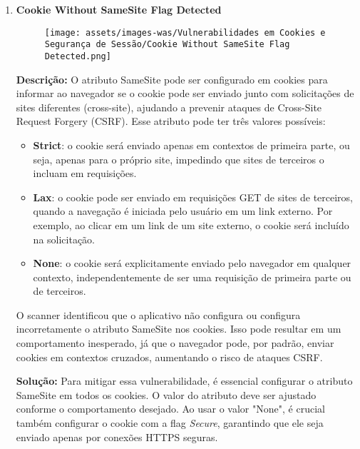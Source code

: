 \documentclass[a4paper,12pt]{article}
\begin{document}
\begin{enumerate}
\item \textbf{Cookie Without SameSite Flag Detected}

                        \begin{figure}[h!]
                        \centering
                        \texttt{[image: assets/images-was/Vulnerabilidades em Cookies e Segurança de Sessão/Cookie Without SameSite Flag Detected.png]}
                        \end{figure}
                        \FloatBarrier
                        \textbf{Descrição:} O atributo SameSite pode ser configurado em cookies para informar ao navegador se o cookie pode ser enviado junto com solicitações de sites diferentes (cross-site), ajudando a prevenir ataques de Cross-Site Request Forgery (CSRF). Esse atributo pode ter três valores possíveis:

    \begin{itemize}
    \item \textbf{Strict}: o cookie será enviado apenas em contextos de primeira parte, ou seja, apenas para o próprio site, impedindo que sites de terceiros o incluam em requisições.
    \item \textbf{Lax}: o cookie pode ser enviado em requisições GET de sites de terceiros, quando a navegação é iniciada pelo usuário em um link externo. Por exemplo, ao clicar em um link de um site externo, o cookie será incluído na solicitação.
    \item \textbf{None}: o cookie será explicitamente enviado pelo navegador em qualquer contexto, independentemente de ser uma requisição de primeira parte ou de terceiros.
    \end{itemize}

O scanner identificou que o aplicativo não configura ou configura incorretamente o atributo SameSite nos cookies. Isso pode resultar em um comportamento inesperado, já que o navegador pode, por padrão, enviar cookies em contextos cruzados, aumentando o risco de ataques CSRF.

\textbf{Solução:} Para mitigar essa vulnerabilidade, é essencial configurar o atributo SameSite em todos os cookies. O valor do atributo deve ser ajustado conforme o comportamento desejado. Ao usar o valor "None", é crucial também configurar o cookie com a flag \textit{Secure}, garantindo que ele seja enviado apenas por conexões HTTPS seguras.


\end{enumerate}
\end{document}
